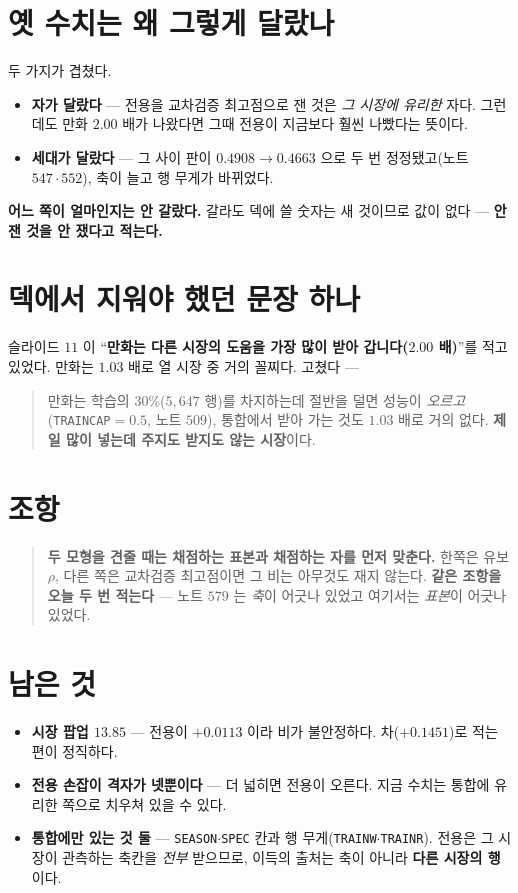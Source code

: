 \documentclass[11pt]{article}
\begin{document}
\section{옛 수치는 왜 그렇게 달랐나}

두 가지가 겹쳤다.

\begin{itemize}
\item \textbf{자가 달랐다} --- 전용을 교차검증 최고점으로 잰 것은
\emph{그 시장에 유리한} 자다. 그런데도 만화 $2.00$ 배가 나왔다면 그때
전용이 지금보다 훨씬 나빴다는 뜻이다.
\item \textbf{세대가 달랐다} --- 그 사이 판이 $0.4908 \to 0.4663$ 으로
두 번 정정됐고(노트 $547 \cdot 552$), 축이 늘고 행 무게가 바뀌었다.
\end{itemize}

\textbf{어느 쪽이 얼마인지는 안 갈랐다.} 갈라도 덱에 쓸 숫자는 새 것이므로
값이 없다 --- \textbf{안 잰 것을 안 쟀다고 적는다.}

\section{덱에서 지워야 했던 문장 하나}

슬라이드 $11$ 이 ``\textbf{만화는 다른 시장의 도움을 가장 많이 받아
갑니다($2.00$ 배)}''를 적고 있었다. 만화는 $1.03$ 배로 열 시장 중 거의
꼴찌다. 고쳤다 ---

\begin{quote}
만화는 학습의 $30\%$($5{,}647$ 행)를 차지하는데 절반을 덜면 성능이
\emph{오르고}(\texttt{TRAINCAP}$=0.5$, 노트 $509$), 통합에서 받아 가는
것도 $1.03$ 배로 거의 없다. \textbf{제일 많이 넣는데 주지도 받지도 않는
시장}이다.
\end{quote}

\section*{조항}

\begin{quote}
\textbf{두 모형을 견줄 때는 채점하는 표본과 채점하는 자를 먼저 맞춘다.}
한쪽은 유보 $\rho$, 다른 쪽은 교차검증 최고점이면 그 비는 아무것도 재지
않는다. \textbf{같은 조항을 오늘 두 번 적는다} --- 노트 $579$ 는
\emph{축}이 어긋나 있었고 여기서는 \emph{표본}이 어긋나 있었다.
\end{quote}

\section*{남은 것}

\begin{itemize}
\item \textbf{시장 팝업 $13.85$} --- 전용이 $+0.0113$ 이라 비가 불안정하다.
차($+0.1451$)로 적는 편이 정직하다.
\item \textbf{전용 손잡이 격자가 넷뿐이다} --- 더 넓히면 전용이 오른다.
지금 수치는 통합에 유리한 쪽으로 치우쳐 있을 수 있다.
\item \textbf{통합에만 있는 것 둘} --- \texttt{SEASON}$\cdot$\texttt{SPEC}
칸과 행 무게(\texttt{TRAINW}$\cdot$\texttt{TRAINR}). 전용은 그 시장이
관측하는 축칸을 \emph{전부} 받으므로, 이득의 출처는 축이 아니라
\textbf{다른 시장의 행}이다.
\end{itemize}
\end{document}
